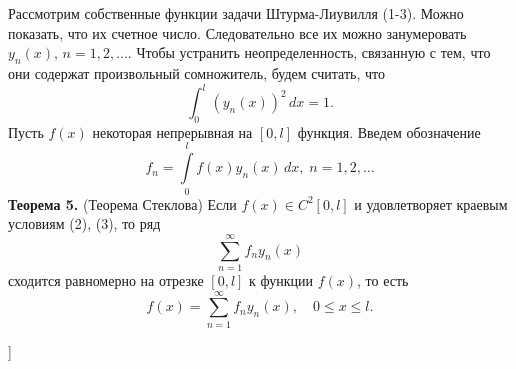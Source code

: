Рассмотрим собственные функции задачи Штурма-Лиувилля (1-3). Можно показать, что их счетное число. Следовательно все их можно занумеровать $y_n(x), \, n = 1, 2, \dots $. Чтобы устранить неопределенность, связанную с тем, что они содержат произвольный сомножитель,
будем считать, что
\begin{equation*}
    \int_0^l (y_n(x))^2 \, dx = 1.
\end{equation*}
Пусть $f(x)$ некоторая непрерывная на $[0, l]$ функция. Введем обозначение
\begin{equation*}
    f_n = \int \limits_0^l f(x) y_n(x) \, dx, \; n=1,2,\dots
\end{equation*}
\textbf{Теорема 5.} (Теорема Стеклова) Если $f(x) \in C^2[0, l]$ и удовлетворяет краевым условиям (2), (3), то ряд
\begin{equation*}
    \sum \limits_{n=1}^{\infty} f_n y_n(x)
\end{equation*}
сходится равномерно на отрезке $[0, l]$ к функции $f(x)$, то есть
\begin{equation*}
    f(x) = \sum \limits_{n=1}^{\infty} f_n y_n(x), \quad 0 \leq x \leq l.
\end{equation*}

\bigbreak
[\cite[page 67]{denisov2}]
